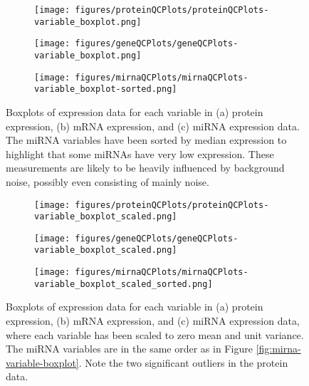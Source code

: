 \begin{figure}
	\centering
	\begin{subfigure}{1\textwidth}
		\centering
		\texttt{[image: figures/proteinQCPlots/proteinQCPlots-variable\_boxplot.png]}
	\end{subfigure}
	\begin{subfigure}{1\textwidth}
		\centering
		\texttt{[image: figures/geneQCPlots/geneQCPlots-variable\_boxplot.png]}
	\end{subfigure}
	\begin{subfigure}{1\textwidth}
		\centering
		\texttt{[image: figures/mirnaQCPlots/mirnaQCPlots-variable\_boxplot-sorted.png]}
	\end{subfigure}%
	\caption{Boxplots of expression data for each variable in
	(a) protein expression, (b) mRNA expression, and (c) miRNA expression data.
	The miRNA variables have been sorted by median expression to highlight that
	some miRNAs have very low expression. These measurements are likely to
	be heavily influenced by background noise, possibly even consisting of
	mainly noise.}
	\label{fig:qc-variable-boxplot}
\end{figure}


\begin{figure}
	\centering
	\begin{subfigure}{1\textwidth}
		\centering
		\texttt{[image: figures/proteinQCPlots/proteinQCPlots-variable\_boxplot\_scaled.png]}
	\end{subfigure}
	\begin{subfigure}{1\textwidth}
		\centering
		\texttt{[image: figures/geneQCPlots/geneQCPlots-variable\_boxplot\_scaled.png]}
	\end{subfigure}
	\begin{subfigure}{1\textwidth}
		\centering
		\texttt{[image: figures/mirnaQCPlots/mirnaQCPlots-variable\_boxplot\_scaled\_sorted.png]}
	\end{subfigure}%
	\caption{Boxplots of expression data for each variable in
	(a) protein expression, (b) mRNA expression, and (c) miRNA expression data,
	where each variable has been scaled to zero mean and unit variance.
	The miRNA variables are in the same order as in Figure \ref{fig:mirna-variable-boxplot}.
	Note the two significant outliers in the protein data.}
	\label{fig:qc-scaled-variable-boxplot}
\end{figure}


